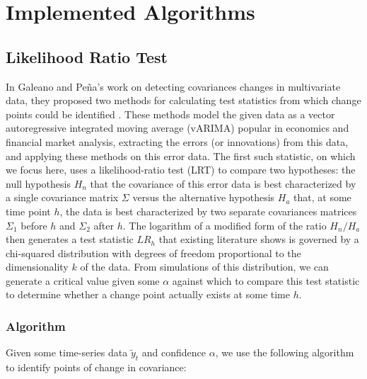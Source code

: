 \documentclass[conference,letterpaper]{IEEEtran}
\begin{document}

\section{Implemented Algorithms}

\subsection{Likelihood Ratio Test}

In Galeano and Pe\~{n}a's work on detecting covariances changes in multivariate data, they proposed two methods for calculating test statistics from which change points could be identified \cite{galeano2007covariance}. 
These methods model the given data as a vector autoregressive integrated moving average (vARIMA) popular in economics and financial market analysis, extracting the errors (or innovations) from this data, and applying these methods on this error data.
The first such statistic, on which we focus here, uses a likelihood-ratio test (LRT) to compare two hypotheses: the null hypothesis $H_n$ that the covariance of this error data is best characterized by a single covariance matrix $\Sigma$ versus the alternative hypothesis $H_a$ that, at some time point $h$, the data is best characterized by two separate covariances matrices $\Sigma_1$ before $h$ and $\Sigma_2$ after $h$.
The logarithm of a modified form of the ratio $H_n/H_a$ then generates a test statistic $LR_{h}$ that existing literature shows is governed by a chi-squared distribution with degrees of freedom proportional to the dimensionality $k$ of the data.
From simulations of this distribution, we can generate a critical value given some $\alpha$ against which to compare this test statistic to determine whether a change point actually exists at some time $h$.

\subsubsection{Algorithm}

Given some time-series data $\tilde{y}_t$ and confidence $\alpha$, we use the following algorithm to identify points of change in covariance:
\end{document}
